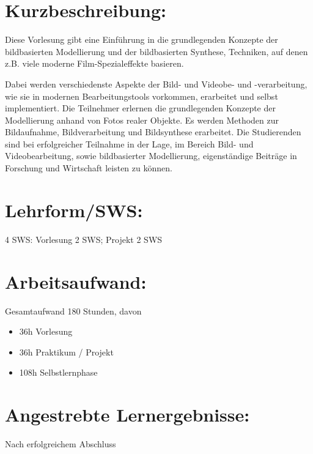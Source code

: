 \section*{Kurzbeschreibung:}\label{kurzbeschreibung-7}

Diese Vorlesung gibt eine Einführung in die grundlegenden Konzepte der
bildbasierten Modellierung und der bildbasierten Synthese, Techniken,
auf denen z.B. viele moderne Film-Spezialeffekte basieren.

Dabei werden verschiedenste Aspekte der Bild- und Videobe- und
-verarbeitung, wie sie in modernen Bearbeitungstools vorkommen,
erarbeitet und selbst implementiert. Die Teilnehmer erlernen die
grundlegenden Konzepte der Modellierung anhand von Fotos realer Objekte.
Es werden Methoden zur Bildaufnahme, Bildverarbeitung und Bildsynthese
erarbeitet. Die Studierenden sind bei erfolgreicher Teilnahme in der
Lage, im Bereich Bild- und Videobearbeitung, sowie bildbasierter
Modellierung, eigenständige Beiträge in Forschung und Wirtschaft leisten
zu können.

\section*{Lehrform/SWS:}\label{lehrformsws-15}

4 SWS: Vorlesung 2 SWS; Projekt 2 SWS

\section*{Arbeitsaufwand:}\label{arbeitsaufwand-16}

Gesamtaufwand 180 Stunden, davon

\begin{itemize}
\tightlist
\item
  36h Vorlesung
\item
  36h Praktikum / Projekt
\item
  108h Selbstlernphase
\end{itemize}

\section*{Angestrebte
Lernergebnisse:}\label{angestrebte-lernergebnisse-15}

Nach erfolgreichem Abschluss

